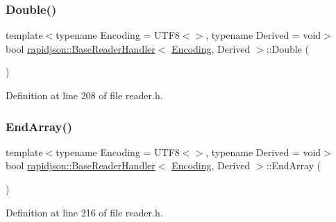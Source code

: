 \subsubsection{\texorpdfstring{Double()}{Double()}}
{\footnotesize\ttfamily template$<$typename Encoding = U\+T\+F8$<$$>$, typename Derived = void$>$ \\
bool \mbox{\hyperlink{structrapidjson_1_1_base_reader_handler}{rapidjson\+::\+Base\+Reader\+Handler}}$<$ \mbox{\hyperlink{classrapidjson_1_1_encoding}{Encoding}}, Derived $>$\+::Double (\begin{DoxyParamCaption}\item[{double}]{ }\end{DoxyParamCaption})}



Definition at line 208 of file reader.\+h.


\begin{DoxyCode}{0}

\end{DoxyCode}
\mbox{\label{structrapidjson_1_1_base_reader_handler_a8fc75176ec793217d40d5a8de049cdb3}} 
\subsubsection{\texorpdfstring{EndArray()}{EndArray()}}
{\footnotesize\ttfamily template$<$typename Encoding = U\+T\+F8$<$$>$, typename Derived = void$>$ \\
bool \mbox{\hyperlink{structrapidjson_1_1_base_reader_handler}{rapidjson\+::\+Base\+Reader\+Handler}}$<$ \mbox{\hyperlink{classrapidjson_1_1_encoding}{Encoding}}, Derived $>$\+::End\+Array (\begin{DoxyParamCaption}\item[{\mbox{\hyperlink{namespacerapidjson_a44eb33eaa523e36d466b1ced64b85c84}{Size\+Type}}}]{ }\end{DoxyParamCaption})}



Definition at line 216 of file reader.\+h.


\begin{DoxyCode}{0}

\end{DoxyCode}
\mbox{\label{structrapidjson_1_1_base_reader_handler_a6216b7af34bbae857ff06363f5b13f5d}} 
